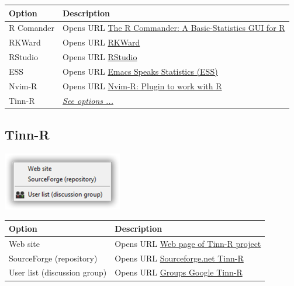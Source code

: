\begin{scriptsize}
  \begin{tabularx}{\textwidth}{>{\hsize=0.3\hsize}X>{\hsize=0.7\hsize}X}\\
    \hline
    \textbf{Option} & \textbf{Description} \\
    \hline
    R Comander & Opens URL \href{http://socserv.socsci.mcmaster.ca/jfox/Misc/Rcmdr/index.html}
     {The R Commander: A Basic-Statistics GUI for R} \\
    RKWard & Opens URL \href{https://rkward.kde.org/}{RKWard} \\
    RStudio & Opens URL \href{http://www.rstudio.com/}{RStudio} \\
    \hdashline[1pt/1pt]
    ESS & Opens URL \href{http://ess.r-project.org/}{Emacs Speaks Statistics (ESS)} \\
    Nvim-R & Opens URL \href{http://www.vim.org/scripts/script.php?script\_id=2628}
     {Nvim-R: Plugin to work with R} \\
    Tinn-R & \textit{\href{\#menu\_web\_tinnr}{See options ...}} \\
    \hline
  \end{tabularx}
\end{scriptsize}


\hypertarget{menu_web_tinnr}{}
\subsection{Tinn-R}

\includegraphics[scale=0.8]{./res/menu_web_tinnr.png}\\


\begin{scriptsize}
  \begin{tabularx}{\textwidth}{>{\hsize=0.3\hsize}X>{\hsize=0.7\hsize}X}\\
    \hline
    \textbf{Option} & \textbf{Description} \\
    \hline
    Web site & Opens URL \href{https://tinn-r.org/en/}{Web page of Tinn-R project} \\
    SourceForge (repository) & Opens URL \href{http://sourceforge.net/projects/tinn-r}
     {Sourceforge.net Tinn-R} \\
    \hdashline[1pt/1pt]
    User list (discussion group) & Opens URL \href{https://groups.google.com/g/tinn-r}{Groups Google Tinn-R} \\
    \hline
  \end{tabularx}
\end{scriptsize}


